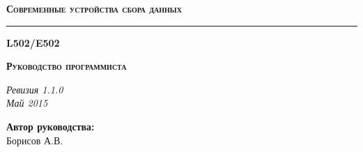 \documentclass[12pt,a4paper,titlepage]{report}
\begin{document}
  \begin{titlepage}
    \topmargin=10mm
    \vspace{45mm}

    \begin{flushright}
    {\bfseries\scshape\Large Современные устройства сбора данных}
    \end{flushright}

    \rule{160mm}{2mm}                %

    \begin{flushright}
    {\bfseries\scshape\Huge L502/E502}
    \end{flushright}

    \begin{flushright}
    {\bfseries\scshape\Large Руководство программиста}
    \end{flushright}

    \vspace{155mm}


	
    \noindent
    \begin{flushright}
    {\itshape\footnotesize Ревизия 1.1.0 \\ Май 2015}
    \end{flushright}

  \end{titlepage}
  
  
  \vspace{5mm}
  \begin{flushleft}
  \textbf{Автор руководства:} \\
  Борисов А.В.
  \end{flushleft}
  
\end{document}
